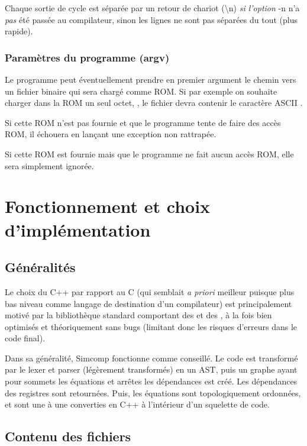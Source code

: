 \documentclass[11pt,a4paper]{article}
\begin{document}
Chaque sortie de cycle est séparée par un retour de chariot (\textbackslash n) \emph{si l'option} -n n'a \emph{pas} été passée au compilateur, sinon les lignes ne sont pas séparées du tout (plus rapide).

\subsubsection*{Paramètres du programme (argv)}

Le programme peut éventuellement prendre en premier argument le chemin vers un fichier binaire qui sera chargé comme ROM. Si par exemple on souhaite charger dans la ROM un seul octet, , le fichier devra contenir le caractère ASCII \og * \fg{}.

Si cette ROM n'est pas fournie et que le programme tente de faire des accès ROM, il échouera en lançant une exception non rattrapée.

Si cette ROM est fournie mais que le programme ne fait aucun accès ROM, elle sera simplement ignorée.

\section{Fonctionnement et choix d'implémentation}

\subsection{Généralités}

Le choix du C++ par rapport au C (qui semblait \textit{a priori} meilleur puisque plus bas niveau comme langage de destination d'un compilateur) est principalement motivé par la bibliothèque standard comportant des  et des , à la fois bien optimisés et théoriquement sans bugs (limitant donc les risques d'erreurs dans le code final).

Dans sa généralité, Simcomp fonctionne comme conseillé. Le code est transformé par le lexer et parser (légèrement transformés) en un AST, puis un graphe ayant pour sommets les équations et arrêtes les dépendances est créé. Les dépendances des registres sont retournées. Puis, les équations sont topologiquement ordonnées, et sont une à une converties en C++ à l'intérieur d'un squelette de code.

\subsection{Contenu des fichiers}
\end{document}
